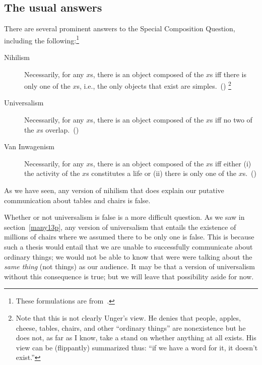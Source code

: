 \documentclass[11pt]{article}
\begin{document}
\begin{spacing}{1.5}
\subsection{The usual answers}
There are several prominent answers to the Special Composition Question, including the following:\footnote{These formulations are from~\citet{markosian1998a}.}
\begin{description}
	\item[Nihilism] Necessarily, for any $x$s, there is an object composed of the $x$s iff there is only one of the $x$s, i.e., the only objects that exist are simples.~(\citeyear[219]{markosian1998a})%
	\footnote{\label{flip} Note that this is not clearly Unger's view. He denies that people, apples, cheese, tables, chairs, and other ``ordinary things'' are nonexistence but he does not, as far as I know, take a stand on whether anything at all exists. His view can be (flippantly) summarized thus: ``if we have a word for it, it doesn't exist.''}
	\item[Universalism] Necessarily, for any $x$s, there is an object composed of the $x$s iff no two of the $x$s overlap.~(\citeyear[227]{markosian1998a})
	\item[Van Inwagenism] Necessarily, for any $x$s, there is an object composed of the $x$s iff either (i) the activity of the $x$s constitutes a life or (ii) there is only one of the $x$s.~(\citeyear[221]{markosian1998a})
\end{description}

As we have seen, any version of nihilism that does explain our putative communication about tables and chairs is false.

Whether or not universalism is false is a more difficult question. As we saw in section~\ref{many13p}, any version of universalism that entails the existence of millions of chairs where we assumed there to be only one is false. This is because such a thesis would entail that we are unable to successfully communicate about ordinary things; we would not be able to know that were were talking about the {\em same thing} (not things) as our audience. It may be that a version of universalism without this consequence is true; but we will leave that possibility aside for now.


\end{spacing}
\end{document}
